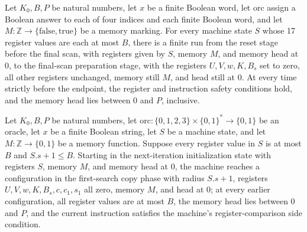 \begin{theorem}
\label{Complexity.LogProg.ExpBFS.fz_run}
\leanok
{}
Let $K_0,B,P$ be natural numbers, let $x$ be a finite Boolean word, let $\mathrm{orc}$
assign a Boolean answer to each of four indices and each finite Boolean word, and let
$M\colon\mathbb{Z}\to\{\mathrm{false},\mathrm{true}\}$ be a memory marking. For every
machine state $S$ whose 17 register values are each at most $B$, there is a finite run
from the reset stage before the final scan, with registers given by $S$, memory $M$, and
memory head at $0$, to the final-scan preparation stage, with the registers
$U,V,w,K,B_s$ set to zero, all other registers unchanged, memory still $M$, and head
still at $0$. At every time strictly before the endpoint, the register and instruction
safety conditions hold, and the memory head lies between $0$ and $P$, inclusive.
\end{theorem}

\begin{theorem}
\label{Complexity.LogProg.ExpBFS.nz_run}
\leanok
{}
Let $K_0,B,P$ be natural numbers, let
$\mathrm{orc}:\{0,1,2,3\}\times\{0,1\}^*\to\{0,1\}$ be an oracle, let $x$ be a finite
Boolean string, let $S$ be a machine state, and let $M:\mathbb{Z}\to\{0,1\}$ be a memory
function. Suppose every register value in $S$ is at most $B$ and $S.s+1\le B$. Starting
in the next-iteration initialization state with registers $S$, memory $M$, and memory
head at $0$, the machine reaches a configuration in the first-search copy phase with
radius $S.s+1$, registers $U,V,w,K,B_s,c,c_1,s_1$ all zero, memory $M$, and head at $0$;
at every earlier configuration, all register values are at most $B$, the memory head
lies between $0$ and $P$, and the current instruction satisfies the machine's
register-comparison side condition.
\end{theorem}
